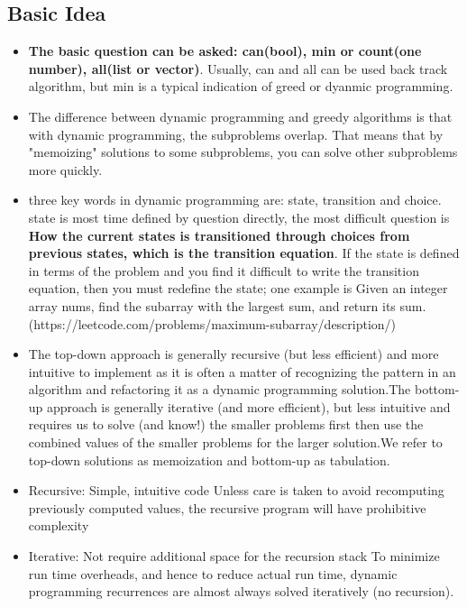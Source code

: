 \documentclass[a4paper,11pt,twoside]{book}
\begin{document}
\subsection{Basic Idea}
\begin{itemize}
	
	\item \textbf{The basic question can be asked: can(bool), min or count(one number), all(list or vector)}. Usually, can and all can be used back track algorithm, but min is a typical indication of greed or dyanmic programming.
	
	\item The difference between dynamic programming and greedy algorithms is that with dynamic programming, the subproblems overlap. That means that by "memoizing" solutions to some subproblems, you can solve other subproblems more quickly. 
	
	\item three key words in dynamic programming are: state, transition and choice. state is most time defined by question directly,  the most difficult question is \textbf{How the current states is transitioned through choices from previous states, which is the transition equation}. If the state is defined in terms of the problem and you find it difficult to write the transition equation, then you must redefine the state; one example is Given an integer array nums, find the 
	subarray with the largest sum, and return its sum. (https://leetcode.com/problems/maximum-subarray/description/)
	
	
	\item The top-down approach is generally recursive (but less efficient) and more intuitive to implement as it is often a matter of recognizing the pattern in an algorithm and refactoring it as a dynamic programming solution.The bottom-up approach is generally iterative (and more efficient), but less intuitive and requires us to solve (and know!) the smaller problems first then use the combined values of the smaller problems for the larger solution.We refer to top-down solutions as memoization and bottom-up as tabulation.
	
	\item Recursive: Simple, intuitive code
	Unless care is taken to avoid recomputing previously computed values, the recursive program will have prohibitive complexity
	
	\item Iterative: Not require additional space for the recursion stack
	To minimize run time overheads, and hence to reduce actual run time, dynamic programming recurrences are almost always solved iteratively    (no recursion).
	

\end{itemize}
\end{document}
